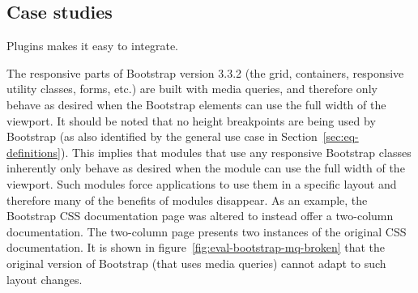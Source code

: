\documentclass{acm_proc_article-sp}
\newcommand{\elq}{ELQ}
\newcommand{\gls}[1]{#1}
\begin{document}

  \subsection{Case studies}
    Plugins makes it easy to integrate.

    The \gls{responsive} parts of \gls{Bootstrap} version 3.3.2 (the grid, containers, \gls{responsive} utility classes, forms, etc.) are built with \gls{media queries}, and therefore only behave as desired when the \gls{Bootstrap} elements can use the full width of the \gls{viewport}.
    It should be noted that no height breakpoints are being used by \gls{Bootstrap} (as also identified by the general use case in Section~\ref{sec:eq-definitions}).
    This implies that modules that use any \gls{responsive} \gls{Bootstrap} classes inherently only behave as desired when the module can use the full width of the \gls{viewport}.
    Such modules force applications to use them in a specific layout and therefore many of the benefits of modules disappear.
    As an example, the \gls{Bootstrap} \gls{CSS} documentation page was altered to instead offer a two-column documentation.
    The two-column page presents two instances of the original \gls{CSS} documentation.
    It is shown in figure~\ref{fig:eval-bootstrap-mq-broken} that the original version of \gls{Bootstrap} (that uses \gls{media queries}) cannot adapt to such layout changes.
   
\end{document}
